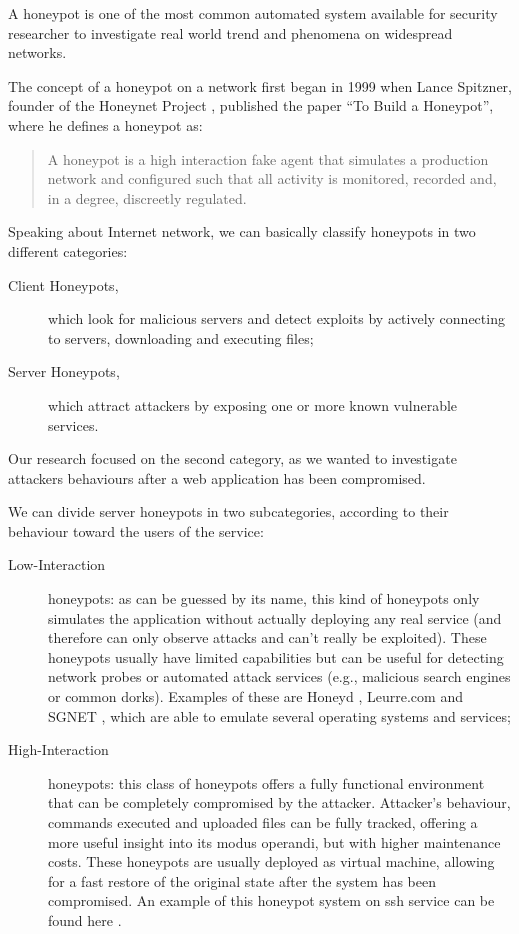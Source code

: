 A honeypot is one of the most common automated system available for security researcher to investigate real world trend and phenomena on widespread networks.

The concept of a honeypot on a network first began in 1999 when Lance Spitzner, founder of the Honeynet Project \cite{honeynetProject}, published the paper ``To Build a Honeypot'', where he defines a honeypot as:
\begin{quote}
A honeypot is a high interaction fake agent that simulates a production network and configured such that all activity is monitored, recorded and, in a degree, discreetly regulated.
\end{quote}
Speaking about Internet network, we can basically classify honeypots in two different categories:
\begin{description}
\item[Client Honeypots,] which look for malicious servers and detect exploits by actively connecting to servers, downloading and executing files;
\item[Server Honeypots,] which attract attackers by exposing one or more known vulnerable services.
\end{description}
Our research focused on the second category, as we wanted to investigate attackers behaviours after a web application has been compromised.

We can divide server honeypots in two subcategories, according to their behaviour toward the users of the service:
\begin{description}
\item[Low-Interaction] honeypots: as can be guessed by its name, this kind of honeypots only simulates the application without actually deploying any real service (and therefore can only observe attacks and can't really be exploited). These honeypots usually have limited capabilities but can be useful for detecting network probes or automated attack services (e.g., malicious search engines or common dorks). Examples of these are Honeyd \cite{honeyd}, Leurre.com \cite{leurre} and SGNET \cite{sgnet}, which are able to emulate several operating systems and services;
\item[High-Interaction] honeypots: this class of honeypots offers a fully functional environment that can be completely compromised by the attacker. Attacker's behaviour, commands executed and uploaded files can be fully tracked, offering a more useful insight into its modus operandi, but with higher maintenance costs. These honeypots are usually deployed as virtual machine, allowing for a fast restore of the original state after the system has been compromised. An example of this honeypot system on ssh service can be found here \cite{highhoney}.
\end{description}

